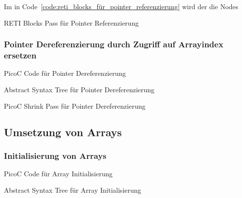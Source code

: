 Im  in Code~\ref{code:reti_blocks_für_pointer_referenzierung} wird der die Nodes \smalltt{}

\begin{code}
  \centering
  \caption{RETI Blocks Pass für Pointer Referenzierung}
  \label{code:reti_blocks_für_pointer_referenzierung}
\end{code}
\subsubsection{Pointer Dereferenzierung durch Zugriff auf Arrayindex ersetzen}
\begin{code}
  \centering
  \caption{PicoC Code für Pointer Dereferenzierung}
  \label{code:picoc_code_für_pointer_dereferenzierung}
\end{code}

\begin{code}
  \centering
  \caption{Abstract Syntax Tree für Pointer Dereferenzierung}
  \label{code:abstract_syntax_tree_für_pointer_dereferenzierung}
\end{code}

\begin{code}
  \centering
  \caption{PicoC Shrink Pass für Pointer Dereferenzierung}
  \label{code:picoc_shrink_für_pointer_dereferenzierung}
\end{code}

\subsection{Umsetzung von Arrays}
\subsubsection{Initialisierung von Arrays}
\begin{code}
  \centering
  \caption{PicoC Code für Array Initialisierung}
  \label{code:picoc_code_für_array_initialisierung}
\end{code}

\begin{code}
  \centering
  \caption{Abstract Syntax Tree für Array Initialisierung}
  \label{code:abstract_syntax_tree_für_array_initialisierung}
\end{code}

